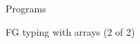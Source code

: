 \begin{figure}
\begin{mathpar}
    \end{mathpar}

    Programs \hfill {}
    \begin{mathpar}
    \end{mathpar}

    \caption{FG typing with arrays (2 of 2)}
\end{figure}
